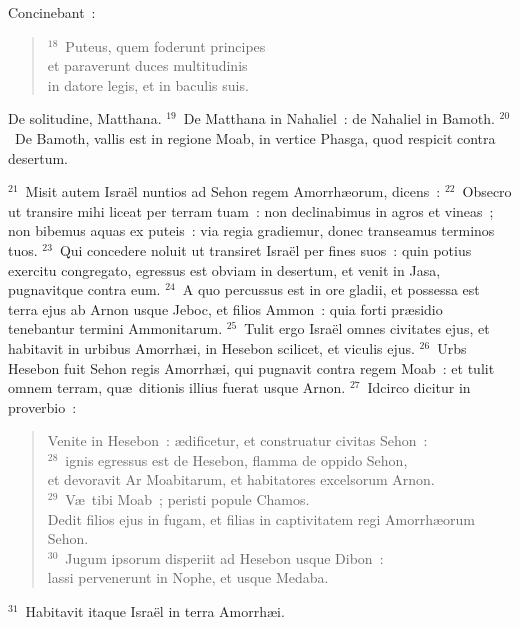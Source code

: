  Concinebant~:
\begin{flushleft}\begin{verse}${}^{18}$~Puteus, quem foderunt principes\\ et paraverunt duces multitudinis\\ in datore legis, et in baculis suis.\end{verse}\end{flushleft}

 De solitudine, Matthana.
${}^{19}$~De Matthana in Nahaliel~: de Nahaliel in Bamoth.
${}^{20}$~De Bamoth, vallis est in regione Moab, in vertice Phasga, quod respicit contra desertum.


${}^{21}$~Misit autem Isra\"el nuntios ad Sehon regem Amorrh\ae orum, dicens~:
${}^{22}$~Obsecro ut transire mihi liceat per terram tuam~: non declinabimus in agros et vineas~; non bibemus aquas ex puteis~: via regia gradiemur, donec transeamus terminos tuos.
${}^{23}$~Qui concedere noluit ut transiret Isra\"el per fines suos~: quin potius exercitu congregato, egressus est obviam in desertum, et venit in Jasa, pugnavitque contra eum.
${}^{24}$~A quo percussus est in ore gladii, et possessa est terra ejus ab Arnon usque Jeboc, et filios Ammon~: quia forti pr\ae sidio tenebantur termini Ammonitarum.
${}^{25}$~Tulit ergo Isra\"el omnes civitates ejus, et habitavit in urbibus Amorrh\ae i, in Hesebon scilicet, et viculis ejus.
${}^{26}$~Urbs Hesebon fuit Sehon regis Amorrh\ae i, qui pugnavit contra regem Moab~: et tulit omnem terram, qu\ae\ ditionis illius fuerat usque Arnon.
${}^{27}$~Idcirco dicitur in proverbio~: \begin{flushleft}\begin{verse}Venite in Hesebon~: \ae dificetur, et construatur civitas Sehon~:\\
${}^{28}$~ignis egressus est de Hesebon, flamma de oppido Sehon,\\ et devoravit Ar Moabitarum, et habitatores excelsorum Arnon.\\
${}^{29}$~V\ae\ tibi Moab~; peristi popule Chamos.\\ Dedit filios ejus in fugam, et filias in captivitatem regi Amorrh\ae orum Sehon.\\
${}^{30}$~Jugum ipsorum disperiit ad Hesebon usque Dibon~:\\ lassi pervenerunt in Nophe, et usque Medaba.\end{verse}\end{flushleft}


${}^{31}$~Habitavit itaque Isra\"el in terra Amorrh\ae i.


